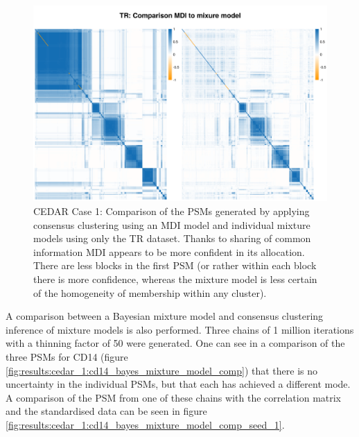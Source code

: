 \documentclass[12pt]{article} %
\begin{document}
	\begin{figure} %
		\centering
		\includegraphics[scale=0.75]{Images/Biology_data/Set_250/Comparison_mdi_mixture_model/TR_comparison_all_specific_sim.png}
		\caption{CEDAR Case 1: Comparison of the PSMs generated by applying consensus clustering using an MDI model and individual mixture models using only the TR dataset. Thanks to sharing of common information MDI appears to be more confident in its allocation. There are less blocks in the first PSM (or rather within each block there is more confidence, whereas the mixture model is less certain of the homogeneity of membership within any cluster).}
		\label{fig:results:cedar_1:mdi_mixture_model_comp_tr}
	\end{figure}
	
	A comparison between a Bayesian mixture model and consensus clustering inference of mixture models is also performed. Three chains of 1 million iterations with a thinning factor of 50 were generated. One can see in a comparison of the three PSMs for CD14 (figure \ref{fig:results:cedar_1:cd14_bayes_mixture_model_comp}) that there is no uncertainty in the individual PSMs, but that each has achieved a different mode. A comparison of the PSM from one of these chains with the correlation matrix and the standardised data can be seen in figure \ref{fig:results:cedar_1:cd14_bayes_mixture_model_comp_seed_1}.
	
\end{document}

